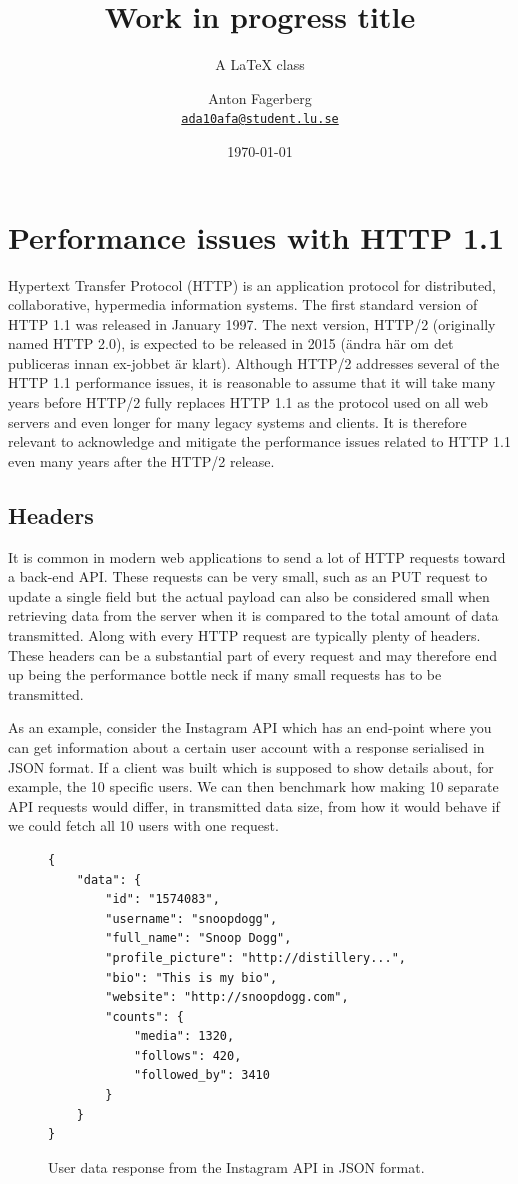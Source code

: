 \documentclass{cslthse-msc}
\author{
	Anton Fagerberg \\
	{\normalsize \href{mailto:ada10afa@student.lu.se}{\texttt{ada10afa@student.lu.se}}}
}
\title{Work in progress title}
\subtitle{A {\LaTeX} class}
\date{\today}
\begin{document}
\makefrontmatter

\chapter{Performance issues with HTTP 1.1}
Hypertext Transfer Protocol (HTTP) is an application protocol for distributed, collaborative, hypermedia information systems\cite{http-info}. The first standard version of HTTP 1.1 was released in January 1997\cite{rfc2068}. The next version, HTTP/2 (originally named HTTP 2.0), is expected to be released in 2015 (ändra här om det publiceras innan ex-jobbet är klart). Although HTTP/2 addresses several of the HTTP 1.1 performance issues, it is reasonable to assume that it will take many years before HTTP/2 fully replaces HTTP 1.1 as the protocol used on all web servers and even longer for many legacy systems and clients. It is therefore relevant to  acknowledge and mitigate the performance issues related to HTTP 1.1 even many years after the HTTP/2 release.

\section{Headers}
\label{headers}

It is common in modern web applications to send a lot of HTTP requests toward a back-end API. These requests can be very small, such as an PUT request to update a single field but the actual payload can also be considered small when retrieving data from the server when it is compared to the total amount of data transmitted. Along with every HTTP request are typically plenty of headers. These headers can be a substantial part of every request and may therefore end up being the performance bottle neck if many small requests has to be transmitted.

As an example, consider the Instagram API\cite{instagram_api} which has an end-point where you can get information about a certain user account with a response serialised in JSON format. If a client was built which is supposed to show details about, for example, the 10 specific users. We can then benchmark how making 10 separate API requests would differ, in transmitted data size, from how it would behave if we could fetch all 10 users with one request.

\begin{figure}[H]
  \centering
    \begin{lstlisting}
{
    "data": {
        "id": "1574083",
        "username": "snoopdogg",
        "full_name": "Snoop Dogg",
        "profile_picture": "http://distillery...",
        "bio": "This is my bio",
        "website": "http://snoopdogg.com",
        "counts": {
            "media": 1320,
            "follows": 420,
            "followed_by": 3410
        }
    }
}
    \end{lstlisting}
  \caption{User data response from the Instagram API in JSON format.}
\end{figure}
\end{document}
